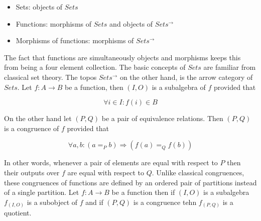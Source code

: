 \documentclass[a4paper,11pt]{report}
\begin{document}
\begin{itemize}
  \item Sets: objects of $Sets$
  \item Functions: morphisms of $Sets$ and objects of $Sets^{\to}$
  \item Morphisms of functions: morphisms of $Sets^{\to}$
\end{itemize}

The fact that functions are simultaneously objects and morphisms keeps this from being a four element collection. The basic concepts of $Sets$ are familiar from classical set theory. The topos $Sets^{\to}$ on the other hand, is the arrow category of $Sets$. Let $f : A \to B$ be a function, then $(I,O)$ is a subalgebra of $f$ provided that 

\[ \forall i \in I : f(i) \in B \]

On the other hand let $(P,Q)$ be a pair of equivalence relations. Then $(P,Q)$ is a congruence of $f$ provided that 

\[ \forall a,b : (a =_P b) \Rightarrow (f(a) =_Q f(b)) \]

In other words, whenever a pair of elements are equal with respect to $P$ then their outputs over $f$ are equal with respect to $Q$. Unlike classical congruences, these congruences of functions are defined by an ordered pair of partitions instead of a single partition. Let $f: A \to B$ be a function then if $(I,O)$ is a subalgebra $f_{(I,O)}$ is a subobject of $f$ and if $(P,Q)$ is a congruence tehn $f_{(P,Q)}$ is a quotient.

\newpage 
\end{document}
